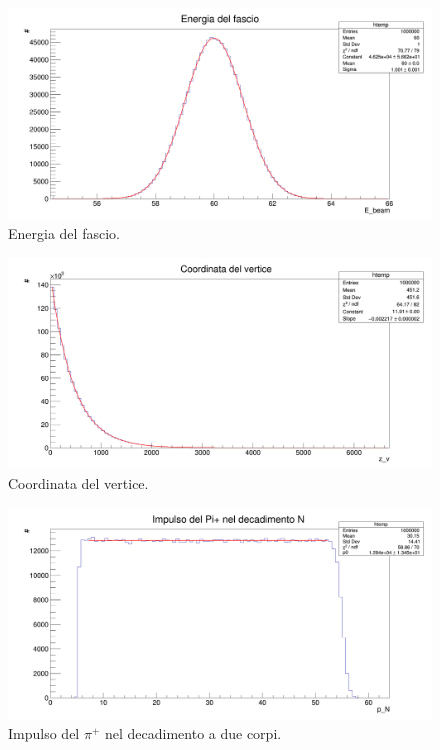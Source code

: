 \documentclass[8pt]{extarticle}
\begin{document}
\begin{figure}
\begin{center}
\includegraphics[scale=0.25]{gen_E_beam}
\caption{Energia del fascio.}
\label{fig:gen_E_beam}
\end{center}
\end{figure}

\begin{figure}
\begin{center}
\includegraphics[scale=0.25]{gen_z}
\caption{Coordinata del vertice.}
\label{fig:gen_z}
\end{center}
\end{figure}

\begin{figure}
\begin{center}
\includegraphics[scale=0.25]{gen_p_N}
\caption{Impulso del $\pi^+$ nel decadimento a due corpi.}
\label{fig:gen_p_N}
\end{center}
\end{figure}
\end{document}
